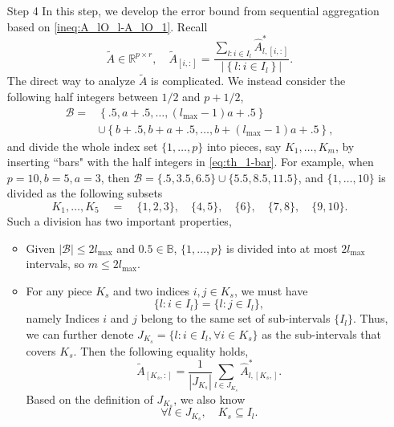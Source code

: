 \documentclass[11pt]{article}
\newcommand{\0}{{\mathbf{0}}}
\newcommand{\1}{{\mathbf{1}}}
\begin{document}
\begin{enumerate}[leftmargin=*]
	\item[Step 4] In this step, we develop the error bound from sequential aggregation based on \eqref{ineq:A_lO_l-A_lO_1}. Recall
	\begin{equation}
	\tilde{A}\in \mathbb{R}^{p\times r}, \quad \tilde{A}_{[i, :]} = \frac{\sum_{l: i\in I_l}\hat{A}_{l, [i, :]}^\ast}{\left|\left\{l: i\in I_l\right\}\right|}.
	\end{equation}
	The direct way to analyze $\tilde{A}$ is complicated. We instead consider the following half integers between $1/2$ and $p+1/2$, 
	\begin{equation}\label{eq:th_1-bar}
	\begin{split}
	\mathcal{B} = & \left\{.5, a+.5, \ldots, (l_{\max}-1)a + .5\right\}\\
	& \cup \left\{b+.5, b+a+.5, \ldots, b+(l_{\max}-1)a + .5\right\},
	\end{split}
	\end{equation}
	and divide the whole index set $\{1,\ldots, p\}$ into pieces, say $K_1,\ldots, K_m$, by inserting ``bars" with the half integers in \eqref{eq:th_1-bar}. For example, when $p = 10, b = 5, a=3$, then $\mathcal{B} = \{.5, 3.5, 6.5\} \cup \{5.5, 8.5, 11.5\}$, and $\{1,\ldots, 10\}$ is divided as the following subsets	
	$$K_1,\ldots, K_5 \quad = \quad \{1,2,3\},\quad \{4, 5\}, \quad\{6\}, \quad \{7, 8\}, \quad \{9, 10\}.$$
	Such a division has two important properties,
	\begin{itemize}
		\item Given $|\mathcal{B}| \leq 2l_{\max}$ and $0.5\in \mathbb{B}$, $\{1,\ldots, p\}$ is divided into at most $2l_{\max}$ intervals, so $m\leq 2l_{\max}$.
		\item For any piece $K_s$ and two indices $i, j \in K_s$, we must have
		$$\{l: i \in I_l\}  = \{l: j\in I_l\},$$
		namely Indices $i$ and $j$ belong to the same set of sub-intervals $\{I_l\}$. Thus, we can further denote $J_{K_s} = \{l: i \in I_l, \forall i \in K_s\}$ as the sub-intervals that covers $K_s$. Then the following equality holds,
		\begin{equation}\label{eq:th1_step3-1}
		\tilde{A}_{[K_s, :]} = \frac{1}{|J_{K_s}|}\sum_{l\in J_{K_s}} \hat{A}_{l, [K_s, ]}^\ast .
		\end{equation}
		Based on the definition of $J_{K_s}$, we also know
		\begin{equation}\label{eq:K_s-subset-I_l}
		\forall l\in J_{K_s}, \quad K_s\subseteq I_l.
		\end{equation}
	\end{itemize}

\end{enumerate}
\end{document}
